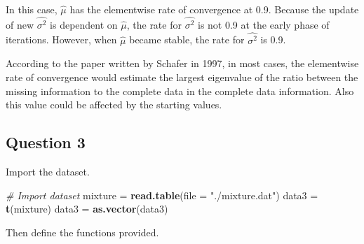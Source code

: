 \documentclass[]{article}
\newenvironment{Shaded}{\begin{snugshade}}{\end{snugshade}}
\newcommand{\CommentTok}[1]{\textcolor[rgb]{0.56,0.35,0.01}{\textit{#1}}}
\newcommand{\DataTypeTok}[1]{\textcolor[rgb]{0.13,0.29,0.53}{#1}}
\newcommand{\KeywordTok}[1]{\textcolor[rgb]{0.13,0.29,0.53}{\textbf{#1}}}
\newcommand{\NormalTok}[1]{#1}
\newcommand{\StringTok}[1]{\textcolor[rgb]{0.31,0.60,0.02}{#1}}
\begin{document}
In this case, \(\hat\mu\) has the elementwise rate of convergence at
0.9. Because the update of new \(\hat{\sigma^2}\) is dependent on
\(\hat\mu\), the rate for \(\hat{\sigma^2}\) is not 0.9 at the early
phase of iterations. However, when \(\hat\mu\) became stable, the rate
for \(\hat{\sigma^2}\) is 0.9.

According to the paper written by Schafer in 1997, in most cases, the
elementwise rate of convergence would estimate the largest eigenvalue of
the ratio between the missing information to the complete data in the
complete data information. Also this value could be affected by the
starting values.

\hypertarget{question-3}{%
\subsection{Question 3}\label{question-3}}

Import the dataset.

\begin{Shaded}
\begin{Highlighting}[]
\CommentTok{# Import dataset}
\NormalTok{mixture =}\StringTok{ }\KeywordTok{read.table}\NormalTok{(}\DataTypeTok{file =} \StringTok{"./mixture.dat"}\NormalTok{)}
\NormalTok{data3 =}\StringTok{ }\KeywordTok{t}\NormalTok{(mixture)}
\NormalTok{data3 =}\StringTok{ }\KeywordTok{as.vector}\NormalTok{(data3)}
\end{Highlighting}
\end{Shaded}

Then define the functions provided.
\end{document}
